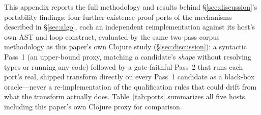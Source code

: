\documentclass[sigplan,screen,review,anonymous]{acmart}
\begin{document}
This appendix reports the full methodology and results behind
\S\ref{sec:discussion}'s portability findings: four further
existence-proof ports of the mechanisms described in \S\ref{sec:algo},
each an independent reimplementation against its host's own AST and
loop construct, evaluated by the same two-pass corpus methodology as
this paper's own Clojure study (\S\ref{sec:discussion}): a syntactic
Pass~1 (an upper-bound proxy, matching a candidate's \emph{shape}
without resolving types or running any code) followed by a
gate-faithful Pass~2 that runs each port's real, shipped transform
directly on every Pass~1 candidate as a black-box oracle---never a
re-implementation of the qualification rules that could drift from
what the transform actually does. Table~\ref{tab:ports} summarizes all
five hosts, including this paper's own Clojure proxy for comparison.
\end{document}
